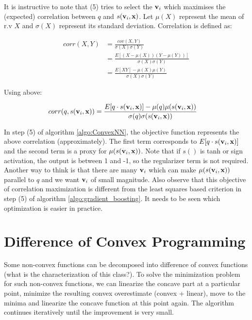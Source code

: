 \documentclass{article}
\begin{document}
It is instructive to note that (5) tries to select the ${\bf v}_i$ which maximises the (expected) correlation between $q$ and $s({\bf v}_i, {\bf x})$. Let $\mu(X)$ represent the mean of r.v $X$ and $\sigma(X)$ represent its standard deviation. Correlation is defined as:

\begin{align}
corr(X, Y) &= \frac{cov(X, Y)}{\sigma(X)\sigma(Y)} \\
	&= \frac{E[(X - \mu(X))(Y - \mu(Y))]}{\sigma(X)\sigma(Y)} \\
	&= \frac{E[XY] - \mu(X)\mu(Y)}{\sigma(X)\sigma(Y)} 
\end{align}  

Using above:

\begin{align}
\label{eq:correlation}
corr(q, s({\bf v}_i, {\bf x})) &= \frac{E[q \cdot s({\bf v}_i, {\bf x})] - \mu(q)\mu(s({\bf v}_i, {\bf x}))}{\sigma(q)\sigma(s({\bf v}_i, {\bf x}))} 
\end{align}  

In step (5) of algorithm \ref{algo:ConvexNN}, the objective function represents the above correlation (approximately). The first term corresponds to $E[q \cdot s({\bf v}_i, {\bf x})]$ and the second term is a proxy for $\mu(s({\bf v}_i, {\bf x}))$. Note that if $s()$ is tanh or sign activation, the output is between 1 and -1, so the regularizer term is not required. Another way to think is that there are many  ${\bf v}_i$ which can make $\mu(s({\bf v}_i, {\bf x}))$ parallel to $q$ and we want ${\bf v}_i$ of small magnitude. Also observe that this objective of correlation maximization is different from the least squares based criterion in step (5) of algorithm \ref{algo:gradient_boosting}. It needs to be seen which optimization is easier in practice.

\section{Difference of Convex Programming}
\label{sec:DC_programming}

Some non-convex functions can be decomposed into difference of convex functions (what is the characterization of this class?). To solve the minimization problem for such non-convex functions, we can linearize the concave part at a particular point, minimize the resulting convex overestimate (convex + linear), move to the minima and linearize the concave function at this point again. The algorithm continues iteratively until the improvement is very small.
\end{document}
